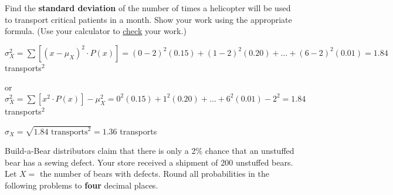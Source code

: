 \documentclass[noanswers]{exam}
\begin{document}
\begin{questions}
\begin{solution}[\stretch{1}]
	\vspace{2mm}
	\end{solution}
	
	\question Find the \textbf{standard deviation} of the number of times a helicopter will be used to transport critical patients in a month. Show your work using the appropriate formula. (Use your calculator to \underline{check} your work.)
	
	\begin{solution}[\stretch{1}]
	\vspace{2mm}
	$\sigma_X^2=\sum \left[(x-\mu_X)^2\cdot P(x)\right]= (0-2)^2(0.15)+(1-2)^2(0.20)+\dots+(6-2)^2(0.01)=1.84$ transports$^2$
	
	\vspace{3mm}
	
	or $\sigma_X^2=\sum \left[ x^2 \cdot P(x) \right] -\mu_X^2 = 0^2(0.15)+1^2(0.20)+\dots+6^2(0.01)-2^2=1.84$ transports$^2$
	\vspace{3mm}
	
	$\sigma_X=\sqrt{1.84 \text{ transports}^2}=1.36$ transports
	\end{solution}
	
	\newpage
	
\question Build-a-Bear distributors claim that there is only a 2\% chance that an unstuffed bear has a sewing defect. Your store received a shipment of 200 unstuffed bears. Let $X=$ the number of bears with defects. Round all probabilities in the following problems to \textbf{four} decimal places.
	
	\vspace{3mm}
	
\end{questions}
\end{document}
